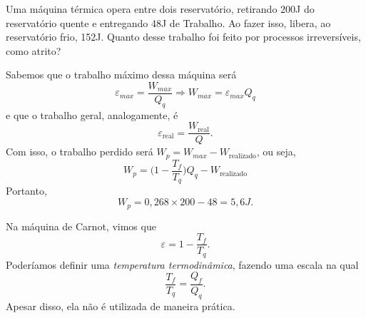\documentclass[PhysicsII/phsyicsII_notes.tex]{subfiles}
\begin{document}
\begin{example}
	Uma máquina térmica opera entre dois reservatório, retirando 200J do reservatório quente e entregando 48J de Trabalho. Ao fazer isso, libera, ao reservatório frio, 152J.
	Quanto desse trabalho foi feito por processos irreversíveis, como atrito?

	Sabemos que o trabalho máximo dessa máquina será
	\[
		\varepsilon_{max} = \frac{W_{max}}{Q_{q}} \Rightarrow W_{max} = \varepsilon_{max}Q_{q}
	\]
	e que o trabalho geral, analogamente, é
	\[
		\varepsilon_{\text{real}}  = \frac{W_{\text{real}}}{Q}.
	\]
	Com isso, o trabalho perdido será \(W_{p} = W_{max} - W_{\text{realizado}}\), ou seja,
	\[
		W_{p} = \biggl(1 - \frac{T_{f}}{T_{q}}\biggr)Q_{q} - W_{\text{realizado}}
	\]
	Portanto,
	\[
		W_{p} = 0,268\times 200 - 48 = 5,6J.
	\]
\end{example}
Na máquina de Carnot, vimos que
\[
	\varepsilon  = 1 - \frac{T_{f}}{T_{q}}.
\]
Poderíamos definir uma \textit{temperatura termodinâmica}, fazendo uma escala na qual
\[
	\frac{T_{f}}{T_{q}} = \frac{Q_{f}}{Q_{q}}.
\]
Apesar disso, ela não é utilizada de maneira prática.
\end{document}
